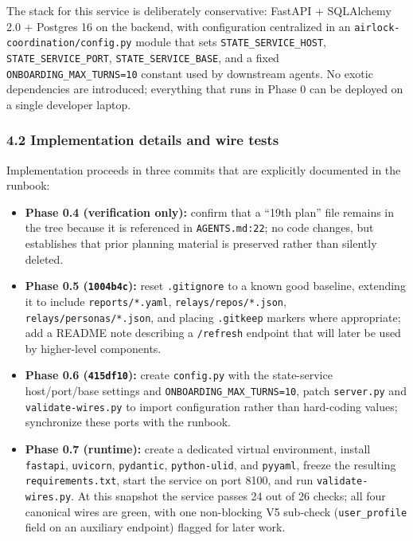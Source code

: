 The stack for this service is deliberately conservative: FastAPI +
SQLAlchemy 2.0 + Postgres 16 on the backend, with configuration
centralized in an \texttt{airlock-coordination/config.py} module that
sets \texttt{STATE\_SERVICE\_HOST}, \texttt{STATE\_SERVICE\_PORT},
\texttt{STATE\_SERVICE\_BASE}, and a fixed
\texttt{ONBOARDING\_MAX\_TURNS=10} constant used by downstream agents.
No exotic dependencies are introduced; everything that runs in Phase 0
can be deployed on a single developer laptop.

\subsubsection{4.2 Implementation details and wire
tests}\label{implementation-details-and-wire-tests}

Implementation proceeds in three commits that are explicitly documented
in the runbook:

\begin{itemize}
\tightlist
\item
  \textbf{Phase 0.4 (verification only):} confirm that a ``19th plan''
  file remains in the tree because it is referenced in
  \texttt{AGENTS.md:22}; no code changes, but establishes that prior
  planning material is preserved rather than silently deleted.
\item
  \textbf{Phase 0.5 (\texttt{1004b4c}):} reset \texttt{.gitignore} to a
  known good baseline, extending it to include \texttt{reports/*.yaml},
  \texttt{relays/repos/*.json}, \texttt{relays/personas/*.json}, and
  placing \texttt{.gitkeep} markers where appropriate; add a README note
  describing a \texttt{/refresh} endpoint that will later be used by
  higher-level components.
\item
  \textbf{Phase 0.6 (\texttt{415df10}):} create \texttt{config.py} with
  the state-service host/port/base settings and
  \texttt{ONBOARDING\_MAX\_TURNS=10}, patch \texttt{server.py} and
  \texttt{validate-wires.py} to import configuration rather than
  hard-coding values; synchronize these ports with the runbook.
\item
  \textbf{Phase 0.7 (runtime):} create a dedicated virtual environment,
  install \texttt{fastapi}, \texttt{uvicorn}, \texttt{pydantic},
  \texttt{python-ulid}, and \texttt{pyyaml}, freeze the resulting
  \texttt{requirements.txt}, start the service on port 8100, and run
  \texttt{validate-wires.py}. At this snapshot the service passes 24 out
  of 26 checks; all four canonical wires are green, with one
  non-blocking V5 sub-check (\texttt{user\_profile} field on an
  auxiliary endpoint) flagged for later work.
\end{itemize}

